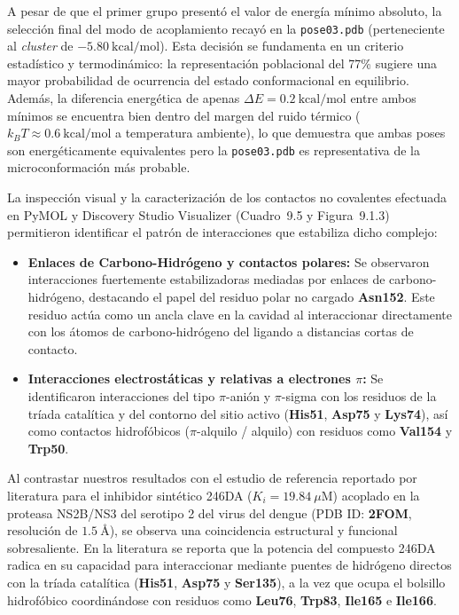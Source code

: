 A pesar de que el primer grupo presentó el valor de energía mínimo absoluto, la selección final del modo de acoplamiento recayó en la \texttt{pose03.pdb} (perteneciente al \textit{cluster} de $-5.80\ \text{kcal/mol}$). Esta decisión se fundamenta en un criterio estadístico y termodinámico: la representación poblacional del 77\% sugiere una mayor probabilidad de ocurrencia del estado conformacional en equilibrio. Además, la diferencia energética de apenas $\Delta E = 0.2\ \text{kcal/mol}$ entre ambos mínimos se encuentra bien dentro del margen del ruido térmico ($k_B T \approx 0.6\ \text{kcal/mol}$ a temperatura ambiente), lo que demuestra que ambas poses son energéticamente equivalentes pero la \texttt{pose03.pdb} es representativa de la microconformación más probable.

La inspección visual y la caracterización de los contactos no covalentes efectuada en PyMOL y Discovery Studio Visualizer (Cuadro~9.5 y Figura~9.1.3) permitieron identificar el patrón de interacciones que estabiliza dicho complejo:

\begin{itemize}
    \item \textbf{Enlaces de Carbono-Hidrógeno y contactos polares:} Se observaron interacciones fuertemente estabilizadoras mediadas por enlaces de carbono-hidrógeno, destacando el papel del residuo polar no cargado \textbf{Asn152}. Este residuo actúa como un ancla clave en la cavidad al interaccionar directamente con los átomos de carbono-hidrógeno del ligando a distancias cortas de contacto.
    \item \textbf{Interacciones electrostáticas y relativas a electrones $\pi$:} Se identificaron interacciones del tipo $\pi$-anión y $\pi$-sigma con los residuos de la tríada catalítica y del contorno del sitio activo (\textbf{His51}, \textbf{Asp75} y \textbf{Lys74}), así como contactos hidrofóbicos ($\pi$-alquilo / alquilo) con residuos como \textbf{Val154} y \textbf{Trp50}.
\end{itemize}

Al contrastar nuestros resultados con el estudio de referencia reportado por literatura para el inhibidor sintético 246DA ($K_i = 19.84\ \mu\text{M}$) acoplado en la proteasa NS2B/NS3 del serotipo 2 del virus del dengue (PDB ID: \textbf{2FOM}, resolución de $1.5\ \text{\AA}$), se observa una coincidencia estructural y funcional sobresaliente. En la literatura se reporta que la potencia del compuesto 246DA radica en su capacidad para interaccionar mediante puentes de hidrógeno directos con la tríada catalítica (\textbf{His51}, \textbf{Asp75} y \textbf{Ser135}), a la vez que ocupa el bolsillo hidrofóbico coordinándose con residuos como \textbf{Leu76}, \textbf{Trp83}, \textbf{Ile165} e \textbf{Ile166}. 

